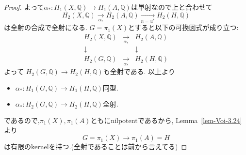 \documentclass[dvipdfmx,a4paper,11pt]{article} %
\theoremstyle{definition}
\theoremstyle{remark}
\numberwithin{equation}{section}
\newcommand{\R}{\mathbb{R}}
\newcommand{\Z}{\mathbb{Z}}
\newcommand{\C}{\mathbb{C}}
\newcommand{\Q}{\mathbb{Q}}
\begin{document}
\begin{proof}

よって\( \alpha_* \colon H_1(X, \mathbb{Q}) \to H_1(A, \mathbb{Q}) \)は単射なので上と合わせて
 \[  
 H_2(X, \mathbb{Q}) \underset{\alpha_*}{\to} 
  H_2(A, \mathbb{Q}) \underset{n=u^{*}}{\to} 
 H_2(H, \mathbb{Q}) 
 \]
 は全射の合成で全射になる. 
 \( G = \pi_1(X) \)とすると以下の可換図式が成り立つ:
\[
\begin{array}{ccc}
H_2(X, \mathbb{Q}) & \underset{\alpha_*}{\longrightarrow}& H_2(A, \mathbb{Q}) \\
\downarrow & & \downarrow \\
H_2(G, \mathbb{Q}) & \underset{\alpha_*}{\longrightarrow} & H_2(H, \mathbb{Q})
\end{array}
\]
よって%
  \(H_2(G, \mathbb{Q}) \to H_2(H, \mathbb{Q}) \)も全射である. 
以上より
\begin{itemize}
\item  \( \alpha_* \colon H_1(G, \mathbb{Q}) \to H_1(H, \mathbb{Q}) \)同型. 
\item   \( \alpha_* \colon H_2(G, \mathbb{Q}) \to H_2(H, \mathbb{Q}) \)全射. 
\end{itemize}
であるので,$\pi_1(X),  \pi_1(A)$ともにnilpotentであるから,  Lemma~\ref{lem-Voi-3.24}より
\[G=\pi_1(X) \to \pi_1(A)=H
\]
は有限のkernelを持つ.(全射であることは前から言えてる)
\end{proof}
\end{document}

